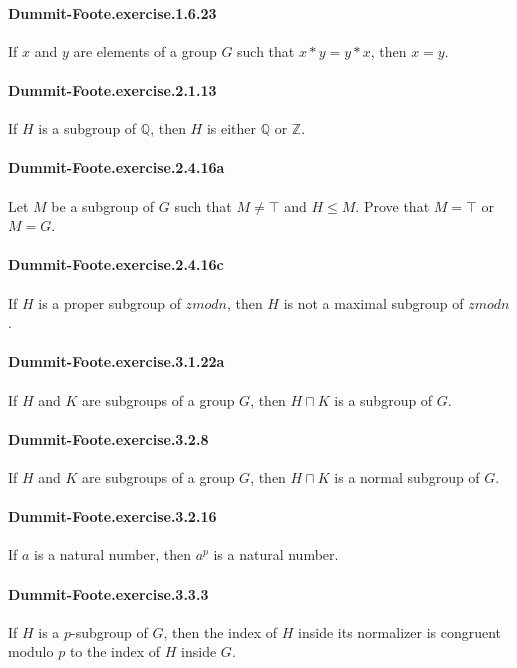 \documentclass{article}
\begin{document}
\paragraph{Dummit-Foote.exercise.1.6.23} If $x$ and $y$ are elements of a group $G$ such that $x*y=y*x$, then $x=y$.

\paragraph{Dummit-Foote.exercise.2.1.13} If $H$ is a subgroup of $\mathbb{Q}$, then $H$ is either $\mathbb{Q}$ or $\mathbb{Z}$.

\paragraph{Dummit-Foote.exercise.2.4.16a} Let $M$ be a subgroup of $G$ such that $M ≠ ⊤$ and $H ≤ M$. Prove that $M = ⊤$ or $M = G$.

\paragraph{Dummit-Foote.exercise.2.4.16c} If $H$ is a proper subgroup of $zmod n$, then $H$ is not a maximal subgroup of $zmod n$.

\paragraph{Dummit-Foote.exercise.3.1.22a} If $H$ and $K$ are subgroups of a group $G$, then $H ⊓ K$ is a subgroup of $G$.

\paragraph{Dummit-Foote.exercise.3.2.8} If $H$ and $K$ are subgroups of a group $G$, then $H ⊓ K$ is a normal subgroup of $G$.

\paragraph{Dummit-Foote.exercise.3.2.16} If $a$ is a natural number, then $a ^ p$ is a natural number.

\paragraph{Dummit-Foote.exercise.3.3.3} If $H$ is a $p$-subgroup of $G$, then the index of $H$ inside its normalizer is congruent modulo $p$ to the index of $H$ inside $G$.
\end{document}
